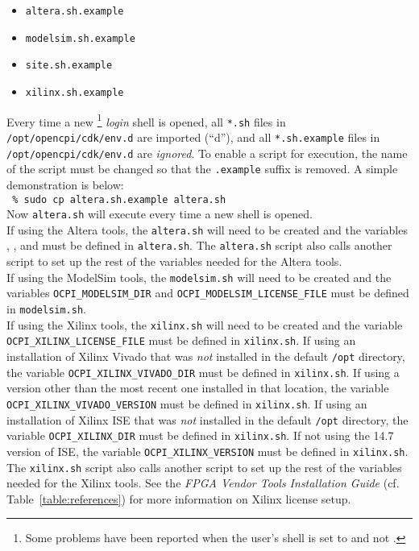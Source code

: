 \begin{itemize}
 	\item \verb+altera.sh.example+
 	\item \verb+modelsim.sh.example+
 	\item \verb+site.sh.example+
 	\item \verb+xilinx.sh.example+
\end{itemize}

Every time a new \footnote{Some problems have been reported when the user's shell is set to  and not .} \textit{login} shell is opened, all \verb+*.sh+ files in \verb+/opt/opencpi/cdk/env.d+ are imported (``d''), and all \verb+*.sh.example+ files in \verb+/opt/opencpi/cdk/env.d+ are \textit{ignored}. To enable a script for execution, the name of the script must be changed so that the \verb+.example+ suffix is removed. A simple demonstration is below:\\

\verb+ % sudo cp altera.sh.example altera.sh+\\

Now \verb+altera.sh+ will execute every time a new shell is opened.\\

If using the Altera tools, the \verb+altera.sh+ will need to be created and the variables , , and  must be defined in \verb+altera.sh+. The \verb+altera.sh+ script also calls another script to set up the rest of the variables needed for the Altera tools.\\

If using the ModelSim tools, the \verb+modelsim.sh+ will need to be created and the variables \verb+OCPI_MODELSIM_DIR+ and \verb+OCPI_MODELSIM_LICENSE_FILE+ must be defined in \verb+modelsim.sh+.\\

If using the Xilinx tools, the \verb+xilinx.sh+ will need to be created and the variable \verb+OCPI_XILINX_LICENSE_FILE+ must be defined in \verb+xilinx.sh+.
If using an installation of Xilinx Vivado that was \textit{not} installed in the default \verb+/opt+ directory, the variable \verb+OCPI_XILINX_VIVADO_DIR+ must be defined in \verb+xilinx.sh+.
If using a version other than the most recent one installed in that location, the variable \verb+OCPI_XILINX_VIVADO_VERSION+ must be defined in \verb+xilinx.sh+.
If using an installation of Xilinx ISE that was \textit{not} installed in the default \verb+/opt+ directory, the variable \verb+OCPI_XILINX_DIR+ must be defined in \verb+xilinx.sh+.
If not using the 14.7 version of ISE, the variable \verb+OCPI_XILINX_VERSION+ must be defined in \verb+xilinx.sh+.
The \verb+xilinx.sh+ script also calls another script to set up the rest of the variables needed for the Xilinx tools.
See the \textit{FPGA Vendor Tools Installation Guide} (cf. Table~\ref{table:references}) for more information on Xilinx license setup.\\

